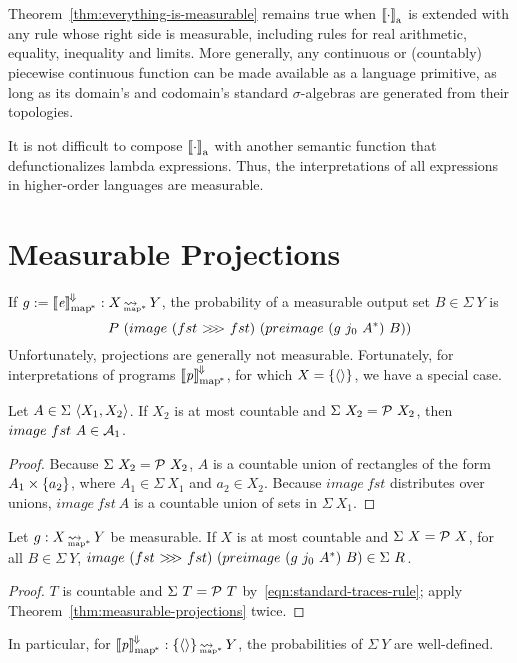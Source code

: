 Theorem~\ref{thm:everything-is-measurable} remains true when $\left\llbracket{\cdot}\right\rrbracket_\mathrm{a}$ is extended with any rule whose right side is measurable, including rules for real arithmetic, equality, inequality and limits.
More generally, any continuous or (countably) piecewise continuous function can be made available as a language primitive, as long as its domain's and codomain's standard $\sigma$-algebras are generated from their topologies.

It is not difficult to compose $\left\llbracket{\cdot}\right\rrbracket_\mathrm{a}$ with another semantic function that defunctionalizes lambda expressions.
Thus, the interpretations of all expressions in higher-order languages are measurable.

\section{Measurable Projections}

If $g := \left\llbracket{\mathit{e}}\right\rrbracket^{\mspace{-2mu}\Downarrow\mspace{-2mu}}_\mathrm{map^{\mspace{-2mu}*}} : X \operatorname{\rightsquigarrow_{\mspace{-22mu}_{\mathrm{map*}}}} Y$, the probability of a measurable output set $B \in \Sigma~Y$ is
\begin{equation}
	P~(image~(fst~{>}\mspace{-6mu}{>}\mspace{-6mu}{>}~fst)~(preimage~(g~j_0~A^*)~B))
\end{equation}
Unfortunately, projections are generally not measurable.
Fortunately, for interpretations of programs $\left\llbracket{\mathit{p}}\right\rrbracket^{\mspace{-2mu}\Downarrow\mspace{-2mu}}_\mathrm{map^{\mspace{-2mu}*}}$, for which $X = \{{\langle{}\rangle}\}$, we have a special case.

\begin{theorem}
\label{thm:measurable-projections}
Let $A \in \Sigma~\langle{X_1,X_2}\rangle$.
If $X_2$ is at most countable and $\Sigma~X_2 = \mathcal{P}~X_2$, then $image~fst~A \in \mathcal{A}_1$.%
\end{theorem}
\begin{proof}
Because $\Sigma~X_2 = \mathcal{P}~X_2$, $A$ is a countable union of rectangles of the form $A_1 \times \{{a_2}\}$, where $A_1 \in \Sigma~X_1$ and $a_2 \in X_2$.
Because $image~fst$ distributes over unions, $image~fst~A$ is a countable union of sets in $\Sigma~X_1$.
\end{proof}

\begin{theorem}
Let $g : X \operatorname{\rightsquigarrow_{\mspace{-22mu}_{\mathrm{map*}}}} Y$ be measurable.
If $X$ is at most countable and $\Sigma~X = \mathcal{P}~X$, for all $B \in \Sigma~Y$, $image~(fst~{>}\mspace{-6mu}{>}\mspace{-6mu}{>}~fst)~(preimage~(g~j_0~A^*)~B) \in \Sigma~R$.
\end{theorem}
\begin{proof}
$T$ is countable and $\Sigma~T = \mathcal{P}~T$ by~\eqref{eqn:standard-traces-rule}; apply Theorem~\ref{thm:measurable-projections} twice.
\end{proof}

In particular, for $\left\llbracket{\mathit{p}}\right\rrbracket^{\mspace{-2mu}\Downarrow\mspace{-2mu}}_\mathrm{map^{\mspace{-2mu}*}} : \{{\langle{}\rangle}\} \operatorname{\rightsquigarrow_{\mspace{-22mu}_{\mathrm{map*}}}} Y$, the probabilities of $\Sigma~Y$ are well-defined.


